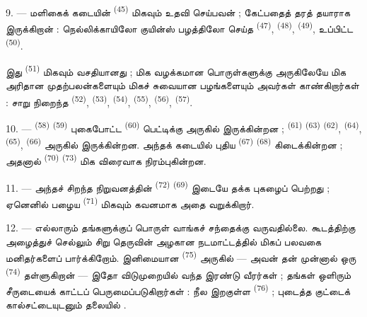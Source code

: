 9. --- மளிகைக் கடையின்  \textsuperscript{(45)}
மிகவும் உதவி செய்பவன் ; கேட்பதைத் தரத் தயாராக இருக்கிறான் :
நெல்லிக்காயிலோ குயின்ஸ் பழத்திலோ செய்த 
\textsuperscript{(47)},  \textsuperscript{(48)},
 \textsuperscript{(49)}, உப்பிட்ட
 \textsuperscript{(50)}.

இது  \textsuperscript{(51)} மிகவும்
வசதியானது ; மிக வழக்கமான பொருள்களுக்கு அருகிலேயே மிக அரிதான
முதற்பலன்களையும் மிகச் சுவையான பழங்களையும் அவர்கள்
காண்கிறார்கள் : சாறு நிறைந்த 
\textsuperscript{(52)},  \textsuperscript{(53)},
 \textsuperscript{(54)}, 
\textsuperscript{(55)}, 
\textsuperscript{(56)}, 
\textsuperscript{(57)}.

\VUsaut{4.0mm}
\VUsaut{3.0mm}

10. ---  \textsuperscript{(58)} 
\textsuperscript{(59)} புகைபோட்ட 
\textsuperscript{(60)} பெட்டிக்கு அருகில் இருக்கின்றன ;
 \textsuperscript{(61)} 
\textsuperscript{(63)}  \textsuperscript{(62)},
 \textsuperscript{(64)},  \textsuperscript{(65)},  \textsuperscript{(66)} அருகில் இருக்கின்றன. அந்தக்
கடையில் புதிய  \textsuperscript{(67)}
 \textsuperscript{(68)} கிடைக்கின்றன ; அதனால்
 \textsuperscript{(70)} 
\textsuperscript{(73)} மிக விரைவாக நிரம்புகின்றன.

11. --- அந்தச் சிறந்த நிறுவனத்தின் 
\textsuperscript{(72)} 
\textsuperscript{(69)}  இடையே தக்க
புகழைப் பெற்றது ; ஏனெனில் பழைய 
\textsuperscript{(71)} மிகவும் கவனமாக அதை வறுக்கிறார்.

\VUsaut{4.0mm}
\VUsaut{3.0mm}

12. --- எல்லாரும் தங்களுக்குப் பொருள் வாங்கச் சந்தைக்கு
வருவதில்லை. கூடத்திற்கு அழைத்துச் செல்லும் சிறு தெருவின் அழகான
நடமாட்டத்தில் மிகப் பலவகை மனிதர்களைப் பார்க்கிறோம். இனிமையான
 \textsuperscript{(75)}
அருகில் — அவன் தன் முன்னால் ஒரு 
\textsuperscript{(74)} தள்ளுகிறான் — இதோ விடுமுறையில் வந்த இரண்டு
வீரர்கள் ; தங்கள் ஒளிரும் சீருடையைக் காட்டப் பெருமைப்படுகிறார்கள் :
நீல  இறகுள்ள 
 \textsuperscript{(76)} ; புடைத்த குட்டைக்
கால்சட்டையுடனும் தலையில் 
.

